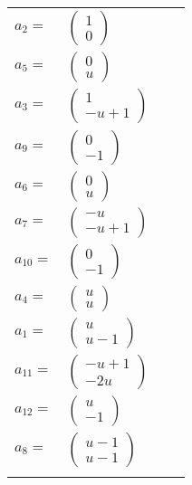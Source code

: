 \documentclass[1p]{elsarticle_modified}
\theoremstyle{definition}
\begin{document}
\begin{tabular}{m{7pt} m{180pt} m{7pt} m{180pt} }
\flushright $a_{2}=$&$\begin{pmatrix}1\\0\end{pmatrix}$ \\
\flushright $a_{5}=$&$\begin{pmatrix}0\\u\end{pmatrix}$ \\
\flushright $a_{3}=$&$\begin{pmatrix}1\\- u+1\end{pmatrix}$ \\
\flushright $a_{9}=$&$\begin{pmatrix}0\\-1\end{pmatrix}$ \\
\flushright $a_{6}=$&$\begin{pmatrix}0\\u\end{pmatrix}$ \\
\flushright $a_{7}=$&$\begin{pmatrix}- u\\- u+1\end{pmatrix}$ \\
\flushright $a_{10}=$&$\begin{pmatrix}0\\-1\end{pmatrix}$ \\
\flushright $a_{4}=$&$\begin{pmatrix}u\\u\end{pmatrix}$ \\
\flushright $a_{1}=$&$\begin{pmatrix}u\\u-1\end{pmatrix}$ \\
\flushright $a_{11}=$&$\begin{pmatrix}- u+1\\-2 u\end{pmatrix}$ \\
\flushright $a_{12}=$&$\begin{pmatrix}u\\-1\end{pmatrix}$ \\
\flushright $a_{8}=$&$\begin{pmatrix}u-1\\u-1\end{pmatrix}$\\&\end{tabular}
\end{document}

